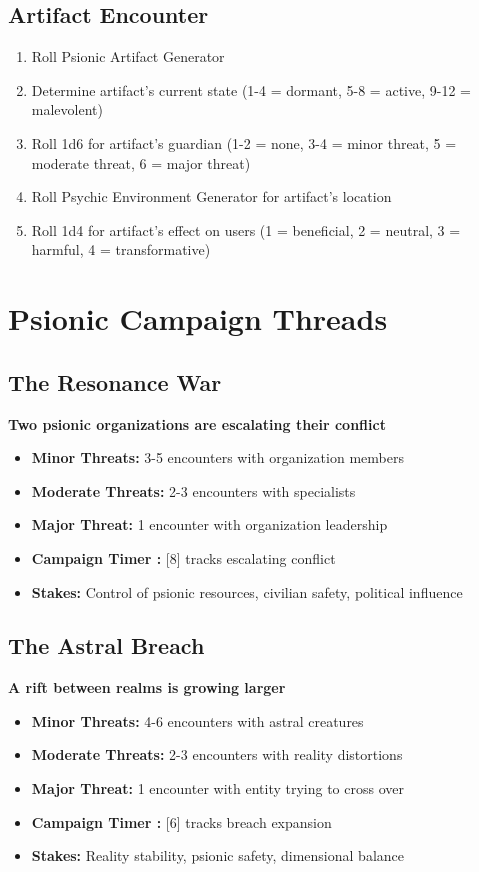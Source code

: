 \documentclass[11pt,twoside]{article}
\begin{document}
\subsection{Artifact Encounter}
\begin{enumerate}[leftmargin=*]
    \item Roll Psionic Artifact Generator
    \item Determine artifact's current state (1-4 = dormant, 5-8 = active, 9-12 = malevolent)
    \item Roll 1d6 for artifact's guardian (1-2 = none, 3-4 = minor threat, 5 = moderate threat, 6 = major threat)
    \item Roll Psychic Environment Generator for artifact's location
    \item Roll 1d4 for artifact's effect on users (1 = beneficial, 2 = neutral, 3 = harmful, 4 = transformative)
\end{enumerate}

\section{Psionic Campaign Threads}

\subsection{The Resonance War}
\textbf{Two psionic organizations are escalating their conflict}
\begin{itemize}[leftmargin=*]
    \item \textbf{Minor Threats:} 3-5 encounters with organization members
    \item \textbf{Moderate Threats:} 2-3 encounters with specialists
    \item \textbf{Major Threat:} 1 encounter with organization leadership
    \item \textbf{Campaign Timer :} [8] tracks escalating conflict
    \item \textbf{Stakes:} Control of psionic resources, civilian safety, political influence
\end{itemize}

\subsection{The Astral Breach}
\textbf{A rift between realms is growing larger}
\begin{itemize}[leftmargin=*]
    \item \textbf{Minor Threats:} 4-6 encounters with astral creatures
    \item \textbf{Moderate Threats:} 2-3 encounters with reality distortions
    \item \textbf{Major Threat:} 1 encounter with entity trying to cross over
    \item \textbf{Campaign Timer :} [6] tracks breach expansion
    \item \textbf{Stakes:} Reality stability, psionic safety, dimensional balance
\end{itemize}
\end{document}
